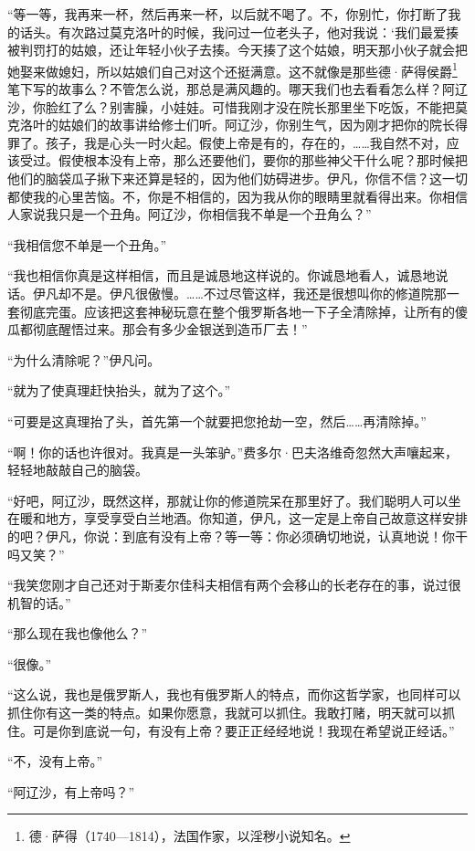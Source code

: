 \par “等一等，我再来一杯，然后再来一杯，以后就不喝了。不，你别忙，你打断了我的话头。有次路过莫克洛叶的时候，我问过一位老头子，他对我说：‘我们最爱揍被判罚打的姑娘，还让年轻小伙子去揍。今天揍了这个姑娘，明天那小伙子就会把她娶来做媳妇，所以姑娘们自己对这个还挺满意。这不就像是那些德·萨得侯爵\footnote{德·萨得（1740—1814），法国作家，以淫秽小说知名。}笔下写的故事么？不管怎么说，那总是满风趣的。哪天我们也去看看怎么样？阿辽沙，你脸红了么？别害臊，小娃娃。可惜我刚才没在院长那里坐下吃饭，不能把莫克洛叶的姑娘们的故事讲给修士们听。阿辽沙，你别生气，因为刚才把你的院长得罪了。孩子，我是心头一时火起。假使上帝是有的，存在的，……我自然不对，应该受过。假使根本没有上帝，那么还要他们，要你的那些神父干什么呢？那时候把他们的脑袋瓜子揪下来还算是轻的，因为他们妨碍进步。伊凡，你信不信？这一切都使我的心里苦恼。不，你是不相信的，因为我从你的眼睛里就看得出来。你相信人家说我只是一个丑角。阿辽沙，你相信我不单是一个丑角么？”
\par “我相信您不单是一个丑角。”
\par “我也相信你真是这样相信，而且是诚恳地这样说的。你诚恳地看人，诚恳地说话。伊凡却不是。伊凡很傲慢。……不过尽管这样，我还是很想叫你的修道院那一套彻底完蛋。应该把这套神秘玩意在整个俄罗斯各地一下子全清除掉，让所有的傻瓜都彻底醒悟过来。那会有多少金银送到造币厂去！”
\par “为什么清除呢？”伊凡问。
\par “就为了使真理赶快抬头，就为了这个。”
\par “可要是这真理抬了头，首先第一个就要把您抢劫一空，然后……再清除掉。”
\par “啊！你的话也许很对。我真是一头笨驴。”费多尔·巴夫洛维奇忽然大声嚷起来，轻轻地敲敲自己的脑袋。
\par “好吧，阿辽沙，既然这样，那就让你的修道院呆在那里好了。我们聪明人可以坐在暖和地方，享受享受白兰地酒。你知道，伊凡，这一定是上帝自己故意这样安排的吧？伊凡，你说：到底有没有上帝？等一等：你必须确切地说，认真地说！你干吗又笑？”
\par “我笑您刚才自己还对于斯麦尔佳科夫相信有两个会移山的长老存在的事，说过很机智的话。”
\par “那么现在我也像他么？”
\par “很像。”
\par “这么说，我也是俄罗斯人，我也有俄罗斯人的特点，而你这哲学家，也同样可以抓住你有这一类的特点。如果你愿意，我就可以抓住。我敢打赌，明天就可以抓住。可是你到底说一句，有没有上帝？要正正经经地说！我现在希望说正经话。”
\par “不，没有上帝。”
\par “阿辽沙，有上帝吗？”
